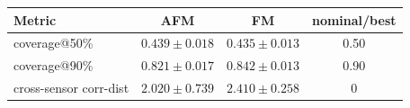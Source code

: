 \begin{tabular}{lccc}
\toprule
Metric & AFM & FM & nominal/best \\
\midrule
coverage@50\% & $0.439\!\pm\!0.018$ & $0.435\!\pm\!0.013$ & 0.50 \\
coverage@90\% & $0.821\!\pm\!0.017$ & $0.842\!\pm\!0.013$ & 0.90 \\
cross-sensor corr-dist & $2.020\!\pm\!0.739$ & $2.410\!\pm\!0.258$ & 0 \\
\bottomrule
\end{tabular}